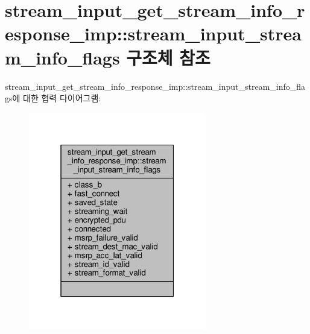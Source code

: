 \hypertarget{structavdecc__lib_1_1stream__input__get__stream__info__response__imp_1_1stream__input__stream__info__flags}{}\section{stream\+\_\+input\+\_\+get\+\_\+stream\+\_\+info\+\_\+response\+\_\+imp\+:\+:stream\+\_\+input\+\_\+stream\+\_\+info\+\_\+flags 구조체 참조}
\label{structavdecc__lib_1_1stream__input__get__stream__info__response__imp_1_1stream__input__stream__info__flags}


stream\+\_\+input\+\_\+get\+\_\+stream\+\_\+info\+\_\+response\+\_\+imp\+:\+:stream\+\_\+input\+\_\+stream\+\_\+info\+\_\+flags에 대한 협력 다이어그램\+:
\nopagebreak
\begin{figure}[H]
\begin{center}
\leavevmode
\includegraphics[width=220pt]{structavdecc__lib_1_1stream__input__get__stream__info__response__imp_1_1stream__input__stream__info__flags__coll__graph}
\end{center}
\end{figure}
